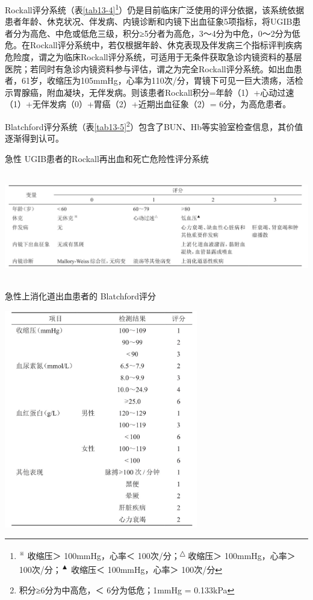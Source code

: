 Rockall评分系统（表\ref{tab13-4}\footnote{\textsuperscript{※} 收缩压＞ 100mmHg，心率＜
100次/分；\textsuperscript{△} 收缩压＞ 100mmHg，心率＞
100次/分；\textsuperscript{▲} 收缩压＜ 100mmHg，心率＞ 100次/分}）仍是目前临床广泛使用的评分依据，该系统依据患者年龄、休克状况、伴发病、内镜诊断和内镜下出血征象5项指标，将UGIB患者分为高危、中危或低危三级，积分≥5分者为高危，3～4分为中危，0～2分为低危。在Rockall评分系统中，若仅根据年龄、休克表现及伴发病三个指标评判疾病危险度，谓之为临床Rockall评分系统，可适用于无条件获取急诊内镜资料的基层医院；若同时有急诊内镜资料参与评估，谓之为完全Rockall评分系统。如出血患者，61岁，收缩压为105mmHg，心率为110次/分，胃镜下可见一巨大溃疡，活检示胃腺癌，附血凝块，无伴发病。则该患者Rockall积分=年龄（1）+心动过速（1）+无伴发病（0）+胃癌（2）+近期出血征象（2）=
6分，为高危患者。

Blatchford评分系统（表\ref{tab13-5}\footnote{积分≥6分为中高危，＜ 6分为低危；1mmHg = 0.133kPa}）包含了BUN、Hb等实验室检查信息，其价值逐渐得到认可。

\begin{table}[htbp]
\centering
\caption{急性 UGIB患者的Rockall再出血和死亡危险性评分系统}
\label{tab13-4}
\includegraphics[width=6.67708in,height=1.83333in]{./images/Image00056.jpg}
\end{table}

\begin{table}[htbp]
\centering
\caption{急性上消化道出血患者的 Blatchford评分}
\label{tab13-5}
\includegraphics[width=3.32292in,height=3.75in]{./images/Image00057.jpg}
\end{table}

